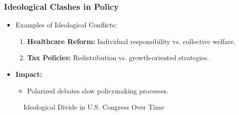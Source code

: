 \documentclass[10pt]{beamer}
\begin{document}
    \begin{frame}
        \frametitle{Ideological Clashes in Policy}
        \begin{itemize}
            \item Examples of Ideological Conflicts:
                \begin{enumerate}
                    \item \textbf{Healthcare Reform:} Individual responsibility vs. collective welfare.
                    \item \textbf{Tax Policies:} Redistribution vs. growth-oriented strategies.
                \end{enumerate}
            \item \textbf{Impact:}
                \begin{itemize}
                    \item Polarized debates slow policymaking processes.
                \end{itemize}
        \end{itemize}
        
        \begin{figure}
            \centering
            \caption{Ideological Divide in U.S. Congress Over Time}
        \end{figure}
        \end{frame}

      
            
\end{document}

